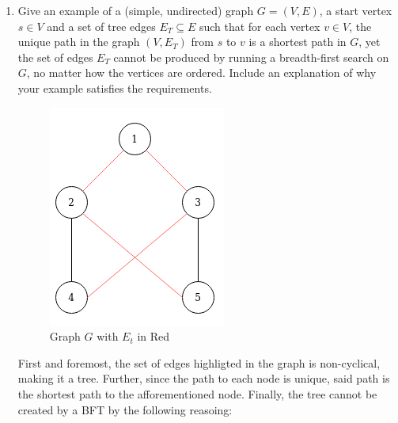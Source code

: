 \documentclass[12pt]{article}
\begin{document}
\begin{enumerate}

\newpage

\item  \label{1} Give an example of a (simple, undirected) graph $G=(V, E)$, a start
vertex $s \in V$ and a set of tree edges $E_{T} \subseteq E$ such that
for each vertex $v \in V$, the unique path in the graph $(V,E_{T})$
from $s$ to $v$ is a shortest path in $G$, yet the set of edges $E_{T}$
cannot be produced by running a breadth-first search on $G$, no matter
how the vertices are ordered. Include an
explanation of why your example satisfies the requirements.\\

\begin{figure}[h]
	\caption{Graph $G$ with $E_t$ in Red}
	\centering
	\includegraphics[scale=0.7]{p1-1.png}
\end{figure}

First and foremost, the set of edges highligted in the graph is non-cyclical, making it a tree. Further, since the path to each node is unique, said path is the shortest path to the afforementioned node. Finally, the tree cannot be created by a BFT by the following reasoing:


\end{enumerate}
\end{document}
